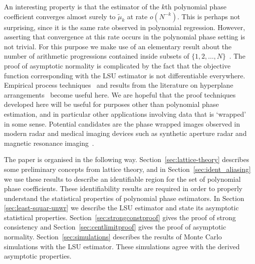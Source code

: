 \documentclass[aap,preprint]{imsart}
\begin{document}
An interesting property is that the estimator of the $k$th polynomial phase coefficient converges almost surely to $\tilde{\mu}_k$ at rate $o(N^{-k})$.  This is perhaps not surprising, since it is the same rate observed in polynomial regression.  However, asserting that convergence at this rate occurs in the polynomial phase setting is not trivial.  For this purpose we make use of an elementary result about the number of arithmetic progressions contained inside subsets of $\{1,2,\dots,N\}$~\cite{Erdos_on_some_sequence_of_integers1936,Szemeredi_setint_no_k_arth1975,Gowers_new_proof2001}.  %
The proof of asymptotic normality is complicated by the fact that the objective function corresponding with the LSU estimator is not differentiable everywhere.  Empirical process techniques~\cite{Pollard_new_ways_clts_1986,Pollard_asymp_empi_proc_1989,van2009empirical,Dudley_unif_central_lim_th_1999} and results from the literature on hyperplane arrangements~\cite{Chazelle_discrepency_method_2000,Matousek_lect_disc_geom_2002} become useful here.  We are hopeful that the proof techniques developed here will be useful for purposes other than polynomial phase estimation, and in particular other applications involving data that is `wrapped' in some sense.  Potential candidates are the phase wrapped images observed in modern radar and medical imaging devices such as synthetic aperture radar and magnetic resonance imaging~\cite{Nico_phaseunwrappingSAR_2000,Friedlander_PD_phaseunwrapping_1996}.

The paper is organised in the following way. Section~\ref{sec:lattice-theory} describes some preliminary concepts from lattice theory, and in Section~\ref{sec:ident_aliasing} we use these results to describe an identifiable region for the set of polynomial phase coefficients.  These identifiability results are required in order to properly understand the statistical properties of polynomial phase estimators. In Section \ref{sec:least-squar-unwr} we describe the LSU estimator and state its asymptotic statistical properties.  Section~\ref{sec:strongconstproof} gives the proof of strong consistency and Section~\ref{sec:centlimitproof} gives the proof of asymptotic normality. 
Section~\ref{sec:simulations} describes the results of Monte Carlo simulations with the LSU estimator.  These simulations agree with the derived asymptotic properties. 
\end{document}
